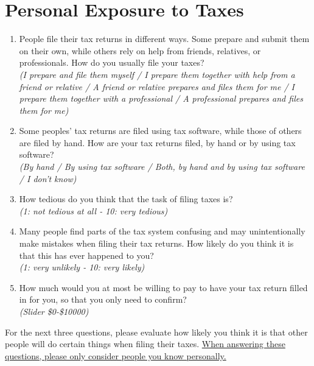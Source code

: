 \documentclass[11pt]{article}
\begin{document}
\section*{Personal Exposure to Taxes}
\begin{enumerate}[resume]
    \item People file their tax returns in different ways. Some prepare and submit them on their own, while others rely on help from friends, relatives, or professionals. How do you usually file your taxes?\\ 
    \textit{(I prepare and file them myself / I prepare them together with help from a friend or relative /  A friend or relative prepares and files them for me / I prepare them together with a professional / A professional prepares and files them for me)}
    \item Some peoples' tax returns are filed using tax software, while those of others are filed by hand. How are your tax returns filed, by hand or by using tax software? \\ 
    \textit{(By hand / By using tax software / Both, by hand and by using tax software / I don't know)}
    \item How tedious do you think that the task of filing taxes is? \\ \textit{(1: not tedious at all - 10: very tedious)}
    \item Many people find parts of the tax system confusing and may unintentionally make mistakes when filing their tax returns. How likely do you think it is that this has ever happened to you?\\
    \textit{(1: very unlikely - 10: very likely) }
    \item How much would you at most be willing to pay to have your tax return filled in for you, so that you only need to confirm? \\
    \textit{(Slider \$0-\$10000)}
\end{enumerate}
For the next three questions, please evaluate how likely you think it is that other people will do certain things when filing their taxes. \uline{When answering these questions, please only consider people you know personally.}
\end{document}
